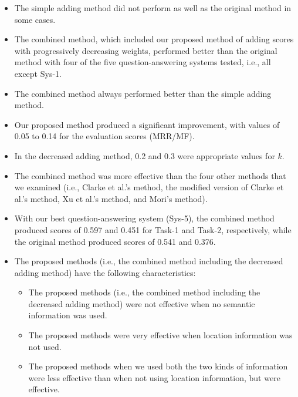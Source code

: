 \begin{itemize}
\item 
  The simple adding method did not perform as well as the original method in some cases. 
  
\item 
  The combined method, which included our proposed method of adding scores with progressively decreasing weights, 
  performed better than the original method with four of the five question-answering systems tested, i.e., all except Sys-1.

\item 
  The combined method always performed better than the simple adding method. 

\item 
  Our proposed method produced a significant improvement, with values of 0.05 to 0.14 for the evaluation scores (MRR/MF).

\item 
  In the decreased adding method, 0.2 and 0.3 were appropriate values for $k$.  

\item 
  The combined method was more effective than the four other methods that we examined (i.e., Clarke et al.'s method, 
  the modified version of Clarke et al.'s method, Xu et al.'s method, and Mori's method).

\item 
  With our best question-answering system (Sys-5), 
  the combined method produced scores of 0.597 and 0.451 for Task-1 and Task-2, respectively, 
  while the original method produced scores of 0.541 and 0.376. 

\item 
  The proposed methods (i.e., the combined method including the decreased adding method) have 
  the following characteristics:

  \begin{itemize}
  \item 
    The proposed methods (i.e., the combined method including the decreased adding method) 
    were not effective 
    when no semantic information was used. 

\item 
  The proposed methods were very effective 
  when location information was not used.  

\item 
  The proposed methods 
  when we used both the two kinds of information
  were less effective than when 
  not using location information, but were effective. 


\end{itemize}
\end{itemize}
